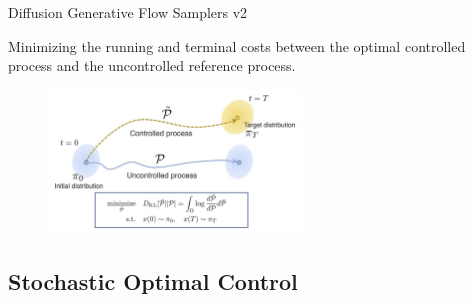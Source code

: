 \documentclass[aspectratio=169,xcolor=dvipsnames]{beamer}
\begin{document}
\begin{frame}[t]{Diffusion Generative Flow Samplers v2}

    Minimizing the running and terminal costs between the optimal controlled process and the uncontrolled reference process.

\begin{figure}
    \centering
    \includegraphics[width=0.6\textwidth]{figures/image.png}
\end{figure}


\end{frame}


\subsection{Stochastic Optimal Control}
\end{document}
